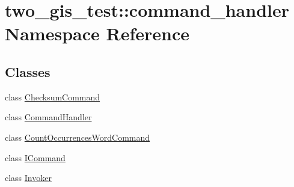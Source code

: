 \hypertarget{namespacetwo__gis__test_1_1command__handler}{}\section{two\+\_\+gis\+\_\+test\+:\+:command\+\_\+handler Namespace Reference}
\label{namespacetwo__gis__test_1_1command__handler}
\subsection*{Classes}
\begin{DoxyCompactItemize}
\item 
class \hyperlink{classtwo__gis__test_1_1command__handler_1_1_checksum_command}{Checksum\+Command}
\item 
class \hyperlink{classtwo__gis__test_1_1command__handler_1_1_command_handler}{Command\+Handler}
\item 
class \hyperlink{classtwo__gis__test_1_1command__handler_1_1_count_occurrences_word_command}{Count\+Occurrences\+Word\+Command}
\item 
class \hyperlink{classtwo__gis__test_1_1command__handler_1_1_i_command}{I\+Command}
\item 
class \hyperlink{classtwo__gis__test_1_1command__handler_1_1_invoker}{Invoker}
\end{DoxyCompactItemize}
